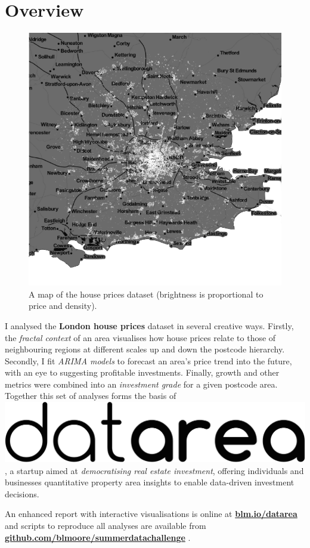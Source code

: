 \documentclass[
10pt, %
a4paper, %
oneside, %
headinclude,footinclude, %
BCOR5mm, %
]{scrartcl}
\newcommand*{\logo}{\includegraphics[scale=.04]{Figures/logotext.png}}
\begin{document}
\section*{Overview} 

\setlength{\intextsep}{0em}
\begin{figure}
\centering
\includegraphics[width=.28\textwidth]{Figures/overview.png}
\vspace{-1em}
\caption*{ A map of the house prices dataset (brightness is proportional to
  price and density).}
\end{figure}

I analysed the {\bf London house prices} dataset in several creative
ways. Firstly, the \emph{fractal context} of an area visualises how house
prices relate to those of neighbouring regions at different scales up
and down the postcode hierarchy. Secondly, I fit \emph{ARIMA models}
to forecast an area's price trend into the future, with an eye to
suggesting profitable investments. Finally, growth and other metrics
were combined into an \emph{investment grade} for a given postcode
area. Together this set of analyses forms the basis of \logo, a
startup aimed at \emph{democratising real estate investment}, offering
individuals and businesses quantitative property area insights to
enable data-driven investment decisions.

An enhanced report with interactive visualisations is online at 
{\bf \leavevmode\href{http://blm.io/datarea}{blm.io/datarea} } 
and scripts to reproduce all analyses are available from 
{\bf
  \leavevmode\href{http://github.com/blmoore/summerdatachallenge}{github.com/blmoore/summerdatachallenge}
}.


\end{document}
